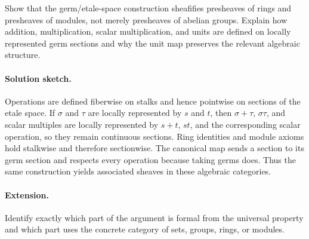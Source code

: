 \begin{problem}
Show that the germ/etale-space construction sheafifies presheaves of rings and presheaves of modules, not merely presheaves of abelian groups. Explain how addition, multiplication, scalar multiplication, and units are defined on locally represented germ sections and why the unit map preserves the relevant algebraic structure.
\end{problem}
\ifdefined\FullProblemDossiers
\paragraph{Solution sketch.}
Operations are defined fiberwise on stalks and hence pointwise on sections of the etale space. If $\sigma$ and $\tau$ are locally represented by $s$ and $t$, then $\sigma+\tau$, $\sigma\tau$, and scalar multiples are locally represented by $s+t$, $st$, and the corresponding scalar operation, so they remain continuous sections. Ring identities and module axioms hold stalkwise and therefore sectionwise. The canonical map sends a section to its germ section and respects every operation because taking germs does. Thus the same construction yields associated sheaves in these algebraic categories.
\paragraph{Extension.}
Identify exactly which part of the argument is formal from the universal property and which part uses the concrete category of sets, groups, rings, or modules.
\fi
